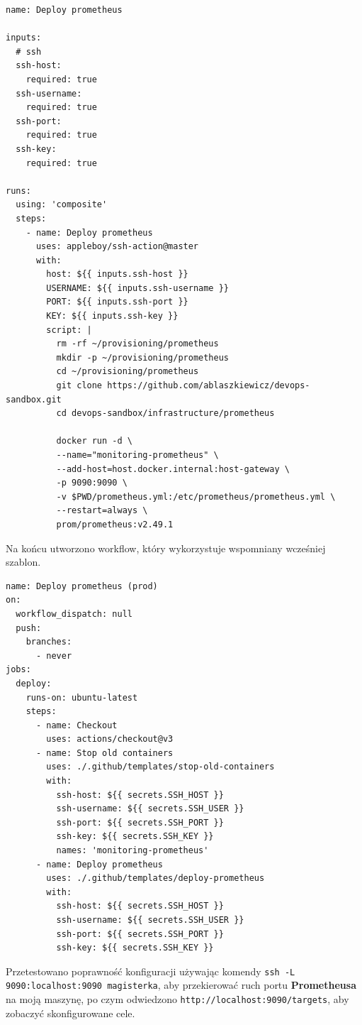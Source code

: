 \documentclass{article}
\begin{document}
\begin{lstlisting}[caption=Plik \texttt{.github/templates/deploy-prometheus/action.yml}]
name: Deploy prometheus

inputs:
  # ssh
  ssh-host:
    required: true
  ssh-username:
    required: true
  ssh-port:
    required: true
  ssh-key:
    required: true

runs:
  using: 'composite'
  steps:
    - name: Deploy prometheus
      uses: appleboy/ssh-action@master
      with:
        host: ${{ inputs.ssh-host }}
        USERNAME: ${{ inputs.ssh-username }}
        PORT: ${{ inputs.ssh-port }}
        KEY: ${{ inputs.ssh-key }}
        script: |
          rm -rf ~/provisioning/prometheus
          mkdir -p ~/provisioning/prometheus
          cd ~/provisioning/prometheus
          git clone https://github.com/ablaszkiewicz/devops-sandbox.git
          cd devops-sandbox/infrastructure/prometheus

          docker run -d \
          --name="monitoring-prometheus" \
          --add-host=host.docker.internal:host-gateway \
          -p 9090:9090 \
          -v $PWD/prometheus.yml:/etc/prometheus/prometheus.yml \
          --restart=always \
          prom/prometheus:v2.49.1
\end{lstlisting}

Na końcu utworzono workflow, który wykorzystuje wspomniany wcześniej szablon.

\begin{lstlisting}[caption=Plik \texttt{.github/workflows/prod-deploy-prometheus.yml}]
name: Deploy prometheus (prod)
on:
  workflow_dispatch: null
  push:
    branches:
      - never
jobs:
  deploy:
    runs-on: ubuntu-latest
    steps:
      - name: Checkout
        uses: actions/checkout@v3
      - name: Stop old containers
        uses: ./.github/templates/stop-old-containers
        with:
          ssh-host: ${{ secrets.SSH_HOST }}
          ssh-username: ${{ secrets.SSH_USER }}
          ssh-port: ${{ secrets.SSH_PORT }}
          ssh-key: ${{ secrets.SSH_KEY }}
          names: 'monitoring-prometheus'
      - name: Deploy prometheus
        uses: ./.github/templates/deploy-prometheus
        with:
          ssh-host: ${{ secrets.SSH_HOST }}
          ssh-username: ${{ secrets.SSH_USER }}
          ssh-port: ${{ secrets.SSH_PORT }}
          ssh-key: ${{ secrets.SSH_KEY }}

\end{lstlisting}

Przetestowano poprawność konfiguracji używając komendy \lstinline|ssh -L 9090:localhost:9090 magisterka|, aby przekierować ruch portu \textbf{Prometheusa} na moją maszynę, po czym odwiedzono \lstinline|http://localhost:9090/targets|, aby zobaczyć skonfigurowane cele.
\end{document}
